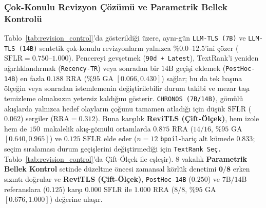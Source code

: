 ﻿\documentclass[journal]{IEEEtran}
\begin{document}
\subsubsection{\c{C}ok-Konulu Revizyon \c{C}\"{o}z\"{u}m\"{u} ve Parametrik Bellek Kontrol\"{u}}
Tablo~\ref{tab:revision_control}'da g\"{o}sterildi\u{g}i \"{u}zere, ayn{\i}-g\"{u}n \texttt{LLM-TLS (7B)} ve \texttt{LLM-TLS (14B)} sentetik \c{c}ok-konulu revizyonlar{\i}n yaln{\i}zca $\%0.0\text{--}12.5$'ini \c{c}\"{o}zer ($\text{SFLR} = 0.750\text{--}1.000$). Pencereyi gev\c{s}etmek (\texttt{90d + Latest}), TextRank'i yeniden a\u{g}{\i}rl{\i}kland{\i}rmak (\texttt{Recency-TR}) veya sonradan bir $14\text{B}$ ge\c{c}i\c{s}i eklemek (\texttt{PostHoc-14B}) en fazla $0.188$ $\text{RRA}$ ($\%95$ GA $[0.066, 0.430]$) sa\u{g}lar; bu da tek ba\c{s}{\i}na \"{o}l\c{c}e\u{g}in veya sonradan istemlemenin de\u{g}i\c{s}tirilebilir durum takibi ve mezar ta\c{s}{\i} temizleme olmaks{\i}z{\i}n yetersiz kald{\i}\u{g}{\i}n{\i} g\"{o}sterir. \texttt{CHRONOS (7B/14B)}, g\"{o}m\"{u}l\"{u} ak{\i}\c{s}larda yaln{\i}zca hedef olaylar{\i}n \c{c}o\u{g}unu tamamen atlad{\i}\u{g}{\i} i\c{c}in d\"{u}\c{s}\"{u}k $\text{SFLR}$ ($0.062$) sergiler ($\text{RRA} = 0.312$). Buna kar\c{s}{\i}l{\i}k \textbf{ReviTLS (\c{C}ift-\"{O}l\c{c}ek)}, hem izole hem de $150$~makalelik ak{\i}\c{s}-g\"{o}m\"{u}l\"{u} ortamlarda $\mathbf{0.875}$ $\text{RRA}$ ($14/16$, $\%95$ GA $[0.640, 0.965]$) ve $\mathbf{0.125}$ $\text{SFLR}$ elde eder ($n=12$ \texttt{bpoil}-hari\c{c} alt k\"{u}mede $0.833$; se\c{c}im s{\i}ralamas{\i} durum ge\c{c}i\c{s}lerini de\u{g}i\c{s}tirmedi\u{g}i i\c{c}in \texttt{TextRank Se\c{c}.} Tablo~\ref{tab:revision_control}'da \c{C}ift-\"{O}l\c{c}ek ile e\c{s}le\c{s}ir). $8$ vakal{\i}k \textbf{Parametrik Bellek Kontrol} setinde d\"{u}zeltme \"{o}ncesi zamansal k\"{o}rl\"{u}k denetimi $\mathbf{0/8}$ erken s{\i}z{\i}nt{\i} do\u{g}rular ve \textbf{ReviTLS (\c{C}ift-\"{O}l\c{c}ek)}, \texttt{PostHoc-14B} ($0.250$) ve $7\text{B}/14\text{B}$ referanslara ($0.125$) kar\c{s}{\i} $\mathbf{0.000}$ $\text{SFLR}$ ile $\mathbf{1.000}$ $\text{RRA}$ ($8/8$, $\%95$ GA $[0.676, 1.000]$) de\u{g}erine ula\c{s}{\i}r.
\end{document}
